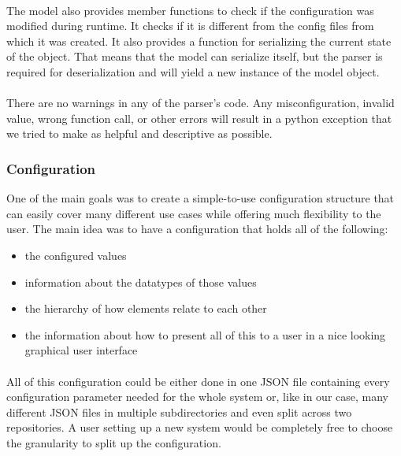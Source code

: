 \paragraph*{} The model also provides member functions to check if the configuration was modified during runtime. It checks if it is different from the config files from which it was created. It also provides a function for serializing the current state of the object. That means that the model can serialize itself, but the parser is required for deserialization and will yield a new instance of the model object.
\paragraph*{} There are no warnings in any of the parser's code. Any misconfiguration, invalid value, wrong function call, or other errors will result in a python exception that we tried to make as helpful and descriptive as possible.

\subsubsection{Configuration}

One of the main goals was to create a simple-to-use configuration structure that can easily cover many different use cases while offering much flexibility to the user.
The main idea was to have a configuration that holds all of the following:
\begin{itemize}
\vspace{-0.2cm}\item the configured values
\vspace{-0.2cm}\item information about the datatypes of those values
\vspace{-0.2cm}\item the hierarchy of how elements relate to each other
\vspace{-0.2cm}\item the information about how to present all of this to a user in a nice looking graphical user interface
\end{itemize}

\paragraph*{} All of this configuration could be either done in one \ac{JSON} file containing every configuration parameter needed for the whole system or, like in our case, many different \ac{JSON} files in multiple subdirectories and even split across two repositories. A user setting up a new system would be completely free to choose the granularity to split up the configuration.


